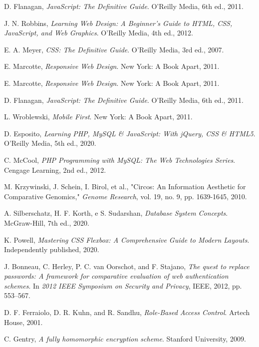 \begin{thebibliography}{99}
D. Flanagan, \textit{JavaScript: The Definitive Guide}. O'Reilly Media, 6th ed., 2011.

J. N. Robbins, \textit{Learning Web Design: A Beginner's Guide to HTML, CSS, JavaScript, and Web Graphics}. O'Reilly Media, 4th ed., 2012.

E. A. Meyer, \textit{CSS: The Definitive Guide}. O'Reilly Media, 3rd ed., 2007.

E. Marcotte, \textit{Responsive Web Design}. New York: A Book Apart, 2011.

E. Marcotte, \textit{Responsive Web Design}. New York: A Book Apart, 2011.

D. Flanagan, \textit{JavaScript: The Definitive Guide}. O'Reilly Media, 6th ed., 2011.

L. Wroblewski, \textit{Mobile First}. New York: A Book Apart, 2011.

D. Esposito, \textit{Learning PHP, MySQL \& JavaScript: With jQuery, CSS \& HTML5}. O'Reilly Media, 5th ed., 2020.

C. McCool, \textit{PHP Programming with MySQL: The Web Technologies Series}. Cengage Learning, 2nd ed., 2012.

M. Krzywinski, J. Schein, I. Birol, et al., "Circos: An Information Aesthetic for Comparative Genomics," \textit{Genome Research}, vol. 19, no. 9, pp. 1639-1645, 2010.

A. Silberschatz, H. F. Korth, e S. Sudarshan, \textit{Database System Concepts}. McGraw-Hill, 7th ed., 2020.

K. Powell, \textit{Mastering CSS Flexbox: A Comprehensive Guide to Modern Layouts}. Independently published, 2020.

J. Bonneau, C. Herley, P. C. van Oorschot, and F. Stajano, \textit{The quest to replace passwords: A framework for comparative evaluation of web authentication schemes}. In \textit{2012 IEEE Symposium on Security and Privacy}, IEEE, 2012, pp. 553–567.

D. F. Ferraiolo, D. R. Kuhn, and R. Sandhu, \textit{Role-Based Access Control}. Artech House, 2001.

C. Gentry, \textit{A fully homomorphic encryption scheme}. Stanford University, 2009.


\end{thebibliography}
